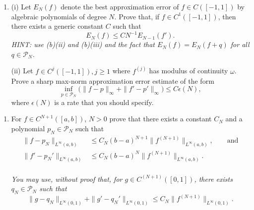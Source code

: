 \documentclass{exams}
\begin{document}
\begin{examcomp1}
\begin{question}
\begin{enumerate}
  (ii) Derive an estimate for the approximation of $f$ in the max-norm by
  algebraic polynomials from the result in (a)(ii).  

  (iii) If $f \in C^1([-1,1])$, give a sharp bound for its modulus of continuity
  $\omega$. 

  \item (i) Let $E_N(f)$ denote the best approximation error of $f \in C([-1,1])$ by
  algebraic polynomials of degree $N$. Prove that, if $f \in C^1([-1,1])$, then
  there exists a generic constant $C$ such that  
  \[
      E_N(f) \leq C N^{-1} E_{N-1}(f').
  \]
  {\it HINT: use (b)(ii) and (b)(iii) and the fact that 
    $E_N(f) = E_N(f+q)$ for all $q \in \mathcal{P}_N$. }

  (ii) Let $f \in C^j([-1,1]), j \geq 1$ where $f^{(j)}$ has modulus of
  continuity $\omega$. Prove a sharp max-norm approximation error estimate of
  the form
  \[
      \inf_{p \in \mathcal{P}_N} 
      \big( \|f - p \|_\infty + \| f' - p' \|_\infty\big) \leq 
      C \epsilon(N),
  \]
  where $\epsilon(N)$ is a rate that you should specify.

  \end{enumerate}
\end{question}

\clearpage


\begin{question}
  \begin{enumerate}

  \item For $f \in C^{N+1}([a, b])$, $N > 0$ prove that there exists  
  a constant $C_N$ and a polynomial $p_N \in \mathcal{P}_N$ such that 
  \begin{align*}
    \| f - p_N \|_{L^\infty(a,b)} 
    &\leq C_N (b-a)^{N+1} \| f^{(N+1)} \|_{L^\infty(a,b)}, 
    \qquad \text{and} \\ 
    \| f' - p_N' \|_{L^\infty(a,b)}
    &\leq C_N (b-a)^{N} \| f^{(N+1)} \|_{L^\infty(a,b)}. \\ 
  \end{align*}
  \vspace{-12mm}

  {\it You may use, without proof that, for $g \in C^{(N+1)}([0,1])$,  
  there exists $q_N \in \mathcal{P}_N$ such that }
  \[
      \| g - q_N \|_{L^\infty(0,1)} 
      + \| g' - q_N' \|_{L^\infty(0,1)}
      \leq C_N \| f^{(N+1)} \|_{L^\infty(0,1)}.
  \]  


\end{enumerate}
\end{question}
\end{examcomp1}
\end{document}
